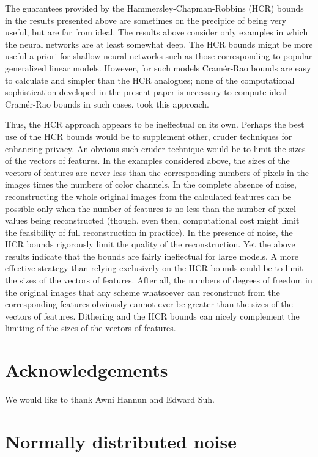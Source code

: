 \documentclass[]{fairmeta}
\begin{document}
The guarantees provided by the Hammersley-Chapman-Robbins (HCR) bounds
in the results presented above are sometimes on the precipice
of being very useful, but are far from ideal.
The results above consider only examples
in which the neural networks are at least somewhat deep.
The HCR bounds might be more useful a-priori for shallow neural-networks
such as those corresponding to popular generalized linear models.
However, for such models Cram\'er-Rao bounds are easy to calculate
and simpler than the HCR analogues; none of the computational sophistication
developed in the present paper is necessary
to compute ideal Cram\'er-Rao bounds in such cases.
\cite{hannun-guo-van-der-maaten} took this approach.

Thus, the HCR approach appears to be ineffectual on its own.
Perhaps the best use of the HCR bounds would be to supplement
other, cruder techniques for enhancing privacy.
An obvious such cruder technique would be to limit the sizes
of the vectors of features. In the examples considered above,
the sizes of the vectors of features are never less than the corresponding
numbers of pixels in the images times the numbers of color channels.
In the complete absence of noise, reconstructing the whole original images
from the calculated features can be possible only when the number of features
is no less than the number of pixel values being reconstructed
(though, even then, computational cost might limit the feasibility
of full reconstruction in practice).
In the presence of noise, the HCR bounds rigorously limit the quality
of the reconstruction. Yet the above results indicate that the bounds
are fairly ineffectual for large models.
A more effective strategy than relying exclusively on the HCR bounds
could be to limit the sizes of the vectors of features.
After all, the numbers of degrees of freedom in the original images
that any scheme whatsoever can reconstruct from the corresponding features
obviously cannot ever be greater than the sizes of the vectors of features.
Dithering and the HCR bounds can nicely complement the limiting of the sizes
of the vectors of features.



\section*{Acknowledgements}

We would like to thank Awni Hannun and Edward Suh.



\appendix
\section{Normally distributed noise}
\label{normalcalc}
\end{document}
